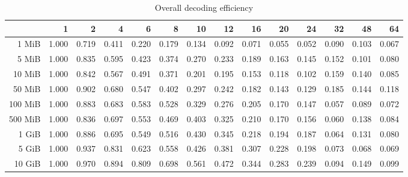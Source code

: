 \begin{table}[!h]
	\centering
	\caption{Overall decoding efficiency}
	\begin{tabular}{rrrrrrrrrrrrrr}
		\toprule
		\diagbox[width=7em]{Size}{Threads}  &    1  &    2  &    4  &    6  &    8  &    10 &    12 &    16 &    20 &    24 &    32 &    48 &    64 \\
		\midrule
		1 MiB   & 1.000 & 0.719 & 0.411 & 0.220 & 0.179 & 0.134 & 0.092 & 0.071 & 0.055 & 0.052 & 0.090 & 0.103 & 0.067 \\
		5 MiB   & 1.000 & 0.835 & 0.595 & 0.423 & 0.374 & 0.270 & 0.233 & 0.189 & 0.163 & 0.145 & 0.152 & 0.101 & 0.080 \\
		10 MiB  & 1.000 & 0.842 & 0.567 & 0.491 & 0.371 & 0.201 & 0.195 & 0.153 & 0.118 & 0.102 & 0.159 & 0.140 & 0.085 \\
		50 MiB  & 1.000 & 0.902 & 0.680 & 0.547 & 0.402 & 0.297 & 0.242 & 0.182 & 0.143 & 0.129 & 0.185 & 0.144 & 0.118 \\
		100 MiB & 1.000 & 0.883 & 0.683 & 0.583 & 0.528 & 0.329 & 0.276 & 0.205 & 0.170 & 0.147 & 0.057 & 0.089 & 0.072 \\
		500 MiB & 1.000 & 0.836 & 0.697 & 0.553 & 0.469 & 0.403 & 0.325 & 0.210 & 0.170 & 0.156 & 0.060 & 0.138 & 0.084 \\
		1 GiB   & 1.000 & 0.886 & 0.695 & 0.549 & 0.516 & 0.430 & 0.345 & 0.218 & 0.194 & 0.187 & 0.064 & 0.131 & 0.080 \\
		5 GiB   & 1.000 & 0.937 & 0.831 & 0.623 & 0.558 & 0.426 & 0.381 & 0.307 & 0.228 & 0.198 & 0.073 & 0.068 & 0.069 \\
		10 GiB  & 1.000 & 0.970 & 0.894 & 0.809 & 0.698 & 0.561 & 0.472 & 0.344 & 0.283 & 0.239 & 0.094 & 0.149 & 0.099 \\
		\bottomrule
	\end{tabular}
\end{table}

